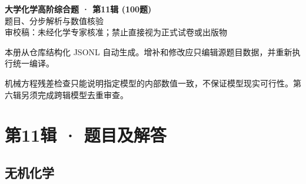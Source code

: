 \documentclass[UTF8,11pt,a4paper]{ctexart}
\begin{document}
\begin{center}
{\LARGE\bfseries 大学化学高阶综合题 · 第11辑 (100题)}\\[0.8em]
{\large 题目、分步解析与数值核验}\\[0.5em]
{\small \textcolor{red!65!black}{审校稿：未经化学专家核准；禁止直接视为正式试卷或出版物}}
\end{center}
\vspace{1em}
\noindent 本册从仓库结构化 JSONL 自动生成。增补和修改应只编辑源题目数据，并重新执行统一编译。
\par 机械方程残差检查只能说明指定模型的内部数值一致，不保证模型现实可行性。第六辑另须完成跨辑模型去重审查。
\tableofcontents
\clearpage
\section*{第11辑 · 题目及解答}
\subsection*{无机化学}
\end{document}

